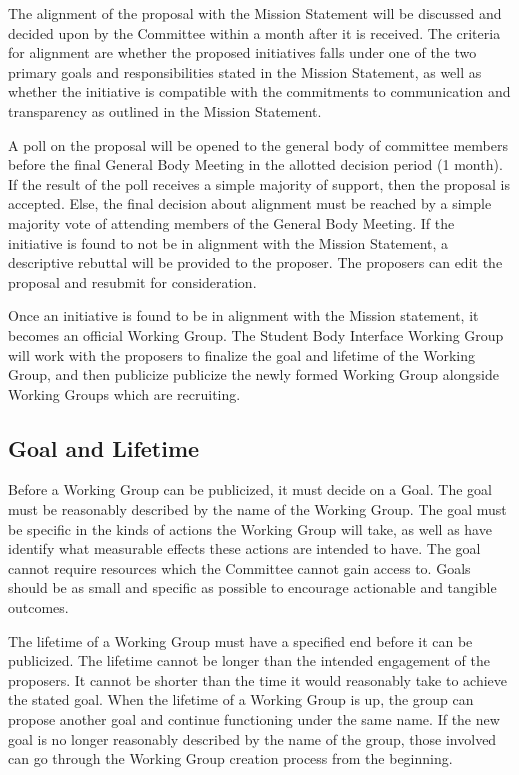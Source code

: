 \documentclass{article}
\begin{document}
The alignment of the proposal with the Mission Statement will be discussed and decided upon by the Committee within a month after it is received. The criteria for alignment are whether the proposed initiatives falls under one of the two primary goals and responsibilities stated in the Mission Statement, as well as whether the initiative is compatible with the commitments to communication and transparency as outlined in the Mission Statement.

A poll on the proposal will be opened to the general body of committee members before the final General Body Meeting in the allotted decision period (1 month). If the result of the poll receives a simple majority of support, then the proposal is accepted.  Else, the final decision about alignment must be reached by a simple majority vote of attending members of the General Body Meeting. If the initiative is found to not be in alignment with the Mission Statement, a descriptive rebuttal will be provided to the proposer. The proposers can edit the proposal and resubmit for consideration. 

Once an initiative is found to be in alignment with the Mission statement, it becomes an official Working Group. The Student Body Interface Working Group will work with the proposers to finalize the goal and lifetime of the Working Group, and then publicize publicize the newly formed Working Group alongside Working Groups which are recruiting.

\subsection{Goal and Lifetime}
Before a Working Group can be publicized, it must decide on a Goal. The goal must be reasonably described by the name of the Working Group. The goal must be specific in the kinds of actions the Working Group will take, as well as have identify what measurable effects these actions are intended to have. The goal cannot require resources which the Committee cannot gain access to. Goals should be as small and specific as possible to encourage actionable and tangible outcomes.

The lifetime of a Working Group must have a specified end before it can be publicized. The lifetime cannot be longer than the intended engagement of the proposers. It cannot be shorter than the time it would reasonably take to achieve the stated goal. When the lifetime of a Working Group is up, the group can propose another goal and continue functioning under the same name. If the new goal is no longer reasonably described by the name of the group, those involved can go through the Working Group creation process from the beginning.
\end{document}

